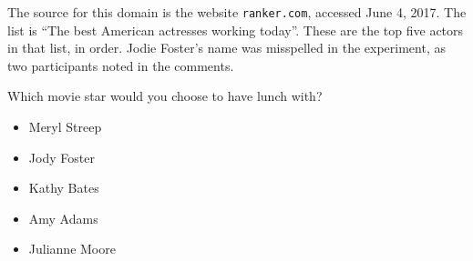 
The source for this domain is the website \texttt{ranker.com}, accessed June 4, 2017.
The list is ``The best American actresses working today''.
These are the top five actors in that list, in order.
Jodie Foster's name was misspelled in the experiment, as two participants noted in the comments.

\begin{tcolorbox}
Which movie star would you choose to have lunch with?

\begin{itemize}
	\setlength\itemsep{-5pt}
	\item Meryl Streep
	\item Jody Foster
	\item Kathy Bates
	\item Amy Adams
	\item Julianne Moore
\end{itemize}
\end{tcolorbox}
